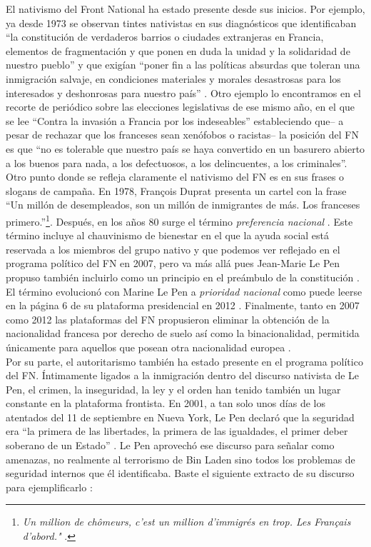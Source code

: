 El nativismo del Front National ha estado presente desde sus inicios. Por ejemplo, ya desde 1973 se observan tintes nativistas en sus diagnósticos que identificaban ``la constitución de verdaderos barrios o ciudades extranjeras en Francia, elementos de fragmentación y que ponen en duda la unidad y la solidaridad de nuestro pueblo'' y que exigían ``poner fin a las políticas absurdas que toleran una inmigración salvaje, en condiciones materiales y morales desastrosas para los interesados y deshonrosas para nuestro país'' \parencite[traducción propia]{LeMonde12}. Otro ejemplo lo encontramos en el recorte de periódico sobre las elecciones legislativas de ese mismo año, en el que se lee ``Contra la invasión a Francia por los indeseables'' estableciendo que-- a pesar de rechazar que los franceses sean xenófobos o racistas-- la posición del FN es que ``no es tolerable que nuestro país se haya convertido en un basurero abierto a los buenos para nada, a los defectuosos, a los delincuentes, a los criminales''\parencite[traducciones propias]{LeTemps17}.\\

Otro punto donde se refleja claramente el nativismo del FN es en sus frases o slogans de campaña. En 1978, François Duprat presenta un cartel con la frase ``Un millón de desempleados, son un millón de inmigrantes de más. Los franceses primero.''\footnote{\textit{Un million de chômeurs, c'est un million d'immigrés en trop. Les Français d'abord."} \parencite{LeMonde12}.}. Después, en los años 80 surge el término \textit{preferencia nacional} \parencite{LeTemps17}. Este término incluye al chauvinismo de bienestar en el que la ayuda social está reservada a los miembros del grupo nativo y que podemos ver reflejado en el programa político del FN en 2007, pero va más allá pues Jean-Marie Le Pen propuso también incluirlo como un principio en el preámbulo de la constitución \parencite{LObs07}. El término evolucionó con Marine Le Pen a \textit{prioridad nacional} como puede leerse en la página  6 de su plataforma presidencial en 2012 \parencite{LePen12}. Finalmente, tanto en 2007 como 2012 las plataformas del FN propusieron eliminar la obtención de la nacionalidad francesa por derecho de suelo así como la binacionalidad, permitida únicamente para aquellos que posean otra nacionalidad europea \parencite{LObs07,LePen12}.\\

Por su parte, el autoritarismo también ha estado presente en el programa político del FN. Íntimamente ligados a la inmigración dentro del discurso nativista de Le Pen, el crimen, la inseguridad, la ley y el orden han tenido también un lugar constante en la plataforma frontista. En 2001, a tan solo unos días de los atentados del 11 de septiembre en Nueva York, Le Pen declaró que la seguridad era ``la primera de las libertades, la primera de las igualdades, el primer deber soberano de un Estado'' \parencite{ViePublique01}. Le Pen aprovechó ese discurso para señalar como amenazas, no realmente al terrorismo de Bin Laden sino todos los problemas de seguridad internos que él identificaba. Baste el siguiente extracto de su discurso para ejemplificarlo \parencite[secc. Rétablir l'ordre et la loi]{ViePublique01}: 

